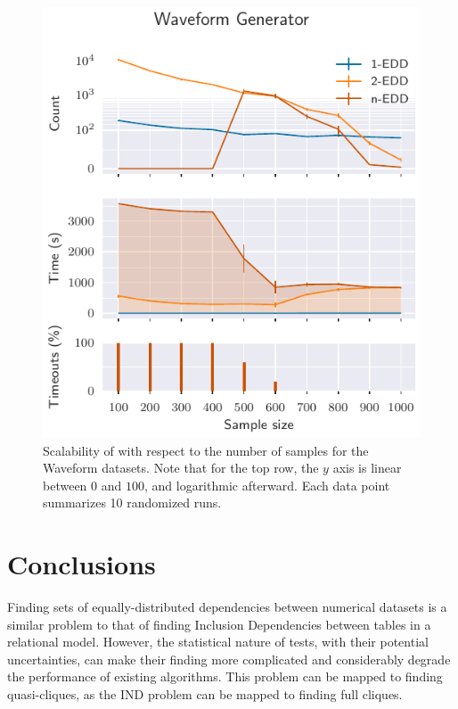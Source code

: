 \begin{figure}[htb]
    \centering
    \includegraphics{images/5_presq/scalability_sample_wave}
    \caption[Scalability of \PresQ with respect to the number of samples.]{
        Scalability of \PresQ with respect to the number of samples for the Waveform datasets.
        Note that for the top row, the $y$ axis is linear between $0$ and $100$, and
        logarithmic afterward. Each data point summarizes 10 randomized runs.
    }
    \label{fig:scalability_sample_size}
\end{figure}

\FloatBarrier

\section{Conclusions}
\label{sec:presq_conclusions}

Finding sets of equally-distributed dependencies between numerical datasets is a similar
problem to that of finding Inclusion Dependencies between tables in a relational model.
However, the statistical nature of tests, with their potential uncertainties, can make
their finding more complicated and considerably degrade the performance of existing algorithms.
This problem can be mapped to finding quasi-cliques, as the \gls{IND} problem can be
mapped to finding full cliques.

